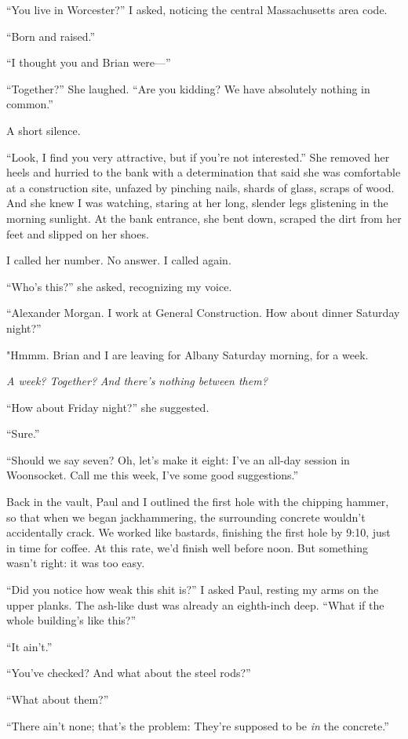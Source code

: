 ``You live in Worcester?'' I asked, noticing the central Massachusetts
area code.

``Born and raised.''

``I thought you and Brian were---''

``Together?'' She laughed. ``Are you kidding? We have absolutely nothing
in common.''

A short silence.

``Look, I find you very attractive, but if you're not interested.'' She
removed her heels and hurried to the bank with a determination that said
she was comfortable at a construction site, unfazed by pinching nails,
shards of glass, scraps of wood. And she knew I was watching, staring at
her long, slender legs glistening in the morning sunlight. At the bank
entrance, she bent down, scraped the dirt from her feet and slipped on
her shoes.

I called her number. No answer. I called again.

``Who's this?'' she asked, recognizing my voice.

``Alexander Morgan. I work at General Construction. How about dinner
Saturday night?''

"Hmmm. Brian and I are leaving for Albany Saturday morning, for a week.

\emph{A week? Together?} \emph{And there's nothing between them?}

``How about Friday night?'' she suggested.

``Sure.''

``Should we say seven? Oh, let's make it eight: I've an all-day session
in Woonsocket. Call me this week, I've some good suggestions.''

Back in the vault, Paul and I outlined the first hole with the chipping
hammer, so that when we began jackhammering, the surrounding concrete
wouldn't accidentally crack. We worked like bastards, finishing the
first hole by 9:10, just in time for coffee. At this rate, we'd finish
well before noon. But something wasn't right: it was too easy.

``Did you notice how weak this shit is?'' I asked Paul, resting my arms
on the upper planks. The ash-like dust was already an eighth-inch deep.
``What if the whole building's like this?''

``It ain't.''

``You've checked? And what about the steel rods?''

``What about them?''

``There ain't none; that's the problem: They're supposed to be \emph{in}
the concrete.''

